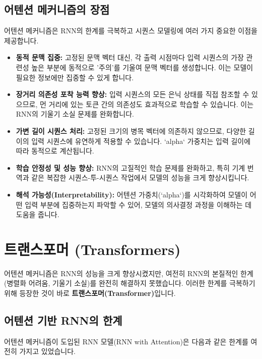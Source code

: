 \documentclass[11pt,a4paper]{article}
\begin{document}
\subsection{어텐션 메커니즘의 장점}
어텐션 메커니즘은 RNN의 한계를 극복하고 시퀀스 모델링에 여러 가지 중요한 이점을 제공합니다.

\begin{summarybox}[title={어텐션 메커니즘의 주요 장점}]
\begin{itemize}
    \item \textbf{동적 문맥 집중:} 고정된 문맥 벡터 대신, 각 출력 시점마다 입력 시퀀스의 가장 관련성 높은 부분에 동적으로 '주의'를 기울여 문맥 벡터를 생성합니다. 이는 모델이 필요한 정보에만 집중할 수 있게 합니다.
    \item \textbf{장거리 의존성 포착 능력 향상:} 입력 시퀀스의 모든 은닉 상태를 직접 참조할 수 있으므로, 먼 거리에 있는 토큰 간의 의존성도 효과적으로 학습할 수 있습니다. 이는 RNN의 기울기 소실 문제를 완화합니다.
    \item \textbf{가변 길이 시퀀스 처리:} 고정된 크기의 병목 벡터에 의존하지 않으므로, 다양한 길이의 입력 시퀀스에 유연하게 적용할 수 있습니다. `alpha` 가중치는 입력 길이에 따라 동적으로 계산됩니다.
    \item \textbf{학습 안정성 및 성능 향상:} RNN의 고질적인 학습 문제를 완화하고, 특히 기계 번역과 같은 복잡한 시퀀스-투-시퀀스 작업에서 모델의 성능을 크게 향상시킵니다.
    \item \textbf{해석 가능성(Interpretability):} 어텐션 가중치(`alpha`)를 시각화하여 모델이 어떤 입력 부분에 집중하는지 파악할 수 있어, 모델의 의사결정 과정을 이해하는 데 도움을 줍니다.
\end{itemize}
\end{summarybox}

\newpage
\section{트랜스포머 (Transformers)}
어텐션 메커니즘은 RNN의 성능을 크게 향상시켰지만, 여전히 RNN의 본질적인 한계(병렬화 어려움, 기울기 소실)를 완전히 해결하지 못했습니다. 이러한 한계를 극복하기 위해 등장한 것이 바로 \textbf{트랜스포머(Transformer)}입니다.

\subsection{어텐션 기반 RNN의 한계}
어텐션 메커니즘이 도입된 RNN 모델(RNN with Attention)은 다음과 같은 한계를 여전히 가지고 있었습니다.
\end{document}
